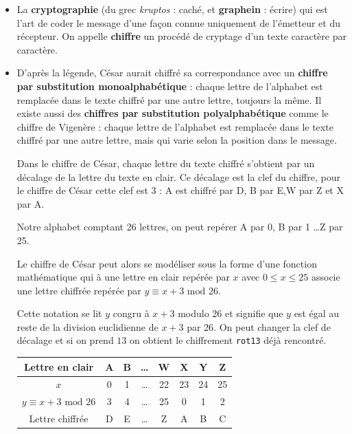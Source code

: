 \documentclass[a4paper, french, 12pt]{article}  %
\newcounter{act}
\begin{document}
\begin{itemize}

\item La \textbf{cryptographie} (du grec \textit{kruptos} : caché, et \textbf{graphein} : écrire) qui est l'art de coder le message d'une façon connue uniquement de l'émetteur et du récepteur. On appelle  \textbf{chiffre} un procédé de cryptage d'un texte caractère par caractère.

\item D'après la légende,  César aurait chiffré sa correspondance avec un  \textbf{chiffre par substitution monoalphabétique} : chaque lettre de l'alphabet est remplacée dans le texte chiffré par une autre lettre, toujours la m\^eme. Il existe aussi des  \textbf{chiffres par substitution polyalphabétique} comme le chiffre de Vigenère : chaque lettre de l'alphabet est remplacée dans le texte chiffré par une autre lettre, mais qui varie selon la position dans le message.

 Dans le  chiffre de César, chaque lettre du texte chiffré s'obtient par un décalage de la lettre du texte en clair. Ce décalage est la clef du chiffre, pour le chiffre de César cette clef est 3 : A est chiffré par D, B par E,W par Z et X par A.

Notre alphabet comptant 26 lettres, on peut repérer  A par 0, B par 1 \ldots Z par 25. 

Le chiffre de César peut alors se modéliser sous la forme d'une fonction mathématique qui à une lettre en clair repérée par $x$ avec $0\leqslant x \leqslant 25$ associe une lettre chiffrée repérée par $y \equiv x+3 \text{ mod } 26$.

Cette notation se lit $y$ congru à $x+3$ modulo 26 et signifie que  $y$ est égal au  reste de la division euclidienne de $x+3$ par 26. On peut changer la clef de décalage et si on prend $13$ on obtient le chiffrement \texttt{rot13} déjà rencontré.

\begin{center}
\begin{tabular}{|c|c|c|c|c|c|c|c|}
\hline 
Lettre en clair & A & B & \ldots & W & X & Y & Z \\ 
\hline 
$x$ & 0 & 1 & \ldots & 22 & 23 & 24 & 25 \\ 
\hline 
$y \equiv x+3 \text{ mod } 26$& 3 & 4 & \ldots & 25 & 0 & 1 & 2 \\ 
\hline 
Lettre chiffrée & D & E & \ldots & Z & A & B & C \\ 
\hline 
\end{tabular} 
\end{center}


\end{itemize}
\end{document}
